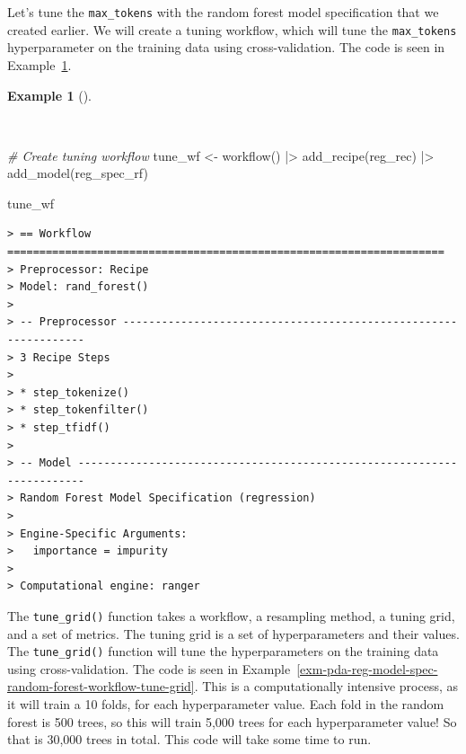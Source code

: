 \documentclass[
  letterpaper,
  DIV=11,
  numbers=noendperiod]{scrreprt}
\newenvironment{Shaded}{\begin{snugshade}}{\end{snugshade}}
\newcommand{\CommentTok}[1]{\textcolor[rgb]{0.00,0.00,0.00}{\textit{#1}}}
\newcommand{\FunctionTok}[1]{\textcolor[rgb]{0.00,0.00,0.00}{#1}}
\newcommand{\NormalTok}[1]{\textcolor[rgb]{0.00,0.00,0.00}{#1}}
\newcommand{\OtherTok}[1]{\textcolor[rgb]{0.00,0.00,0.00}{#1}}
\newcommand{\SpecialCharTok}[1]{\textcolor[rgb]{0.00,0.00,0.00}{#1}}
\theoremstyle{definition}
\newtheorem{example}{Example}[chapter]
\theoremstyle{remark}
\begin{document}
Let's tune the \texttt{max\_tokens} with the random forest model
specification that we created earlier. We will create a tuning workflow,
which will tune the \texttt{max\_tokens} hyperparameter on the training
data using cross-validation. The code is seen in
Example~\ref{exm-pda-reg-model-spec-random-forest-workflow-tune}.

\begin{example}[]\protect\hypertarget{exm-pda-reg-model-spec-random-forest-workflow-tune}{}\label{exm-pda-reg-model-spec-random-forest-workflow-tune}

~

\begin{Shaded}
\begin{Highlighting}[]
\CommentTok{\# Create tuning workflow}
\NormalTok{tune\_wf }\OtherTok{\textless{}{-}}
  \FunctionTok{workflow}\NormalTok{() }\SpecialCharTok{|\textgreater{}}
  \FunctionTok{add\_recipe}\NormalTok{(reg\_rec) }\SpecialCharTok{|\textgreater{}}
  \FunctionTok{add\_model}\NormalTok{(reg\_spec\_rf)}

\NormalTok{tune\_wf}
\end{Highlighting}
\end{Shaded}

\begin{verbatim}
> == Workflow ====================================================================
> Preprocessor: Recipe
> Model: rand_forest()
> 
> -- Preprocessor ----------------------------------------------------------------
> 3 Recipe Steps
> 
> * step_tokenize()
> * step_tokenfilter()
> * step_tfidf()
> 
> -- Model -----------------------------------------------------------------------
> Random Forest Model Specification (regression)
> 
> Engine-Specific Arguments:
>   importance = impurity
> 
> Computational engine: ranger
\end{verbatim}

\end{example}

The \texttt{tune\_grid()} function takes a workflow, a resampling
method, a tuning grid, and a set of metrics. The tuning grid is a set of
hyperparameters and their values. The \texttt{tune\_grid()} function
will tune the hyperparameters on the training data using
cross-validation. The code is seen in
Example~\ref{exm-pda-reg-model-spec-random-forest-workflow-tune-grid}.
This is a computationally intensive process, as it will train a 10
folds, for each hyperparameter value. Each fold in the random forest is
500 trees, so this will train 5,000 trees for each hyperparameter value!
So that is 30,000 trees in total. This code will take some time to run.
\end{document}
